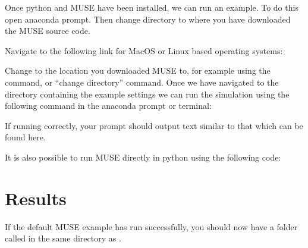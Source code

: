 \documentclass[letterpaper,10pt,english]{sphinxmanual}
\begin{document}
Once python and MUSE have been installed, we can run an example. To do this open anaconda prompt. Then change directory to where you have downloaded the MUSE source code.

Navigate to the following link for MacOS or Linux based operating systems:


Change  to the location you downloaded MUSE to, for example  using the  command, or “change directory” command. Once we have navigated to the directory containing the example settings  we can run the simulation using the following command in the anaconda prompt or terminal:


If running correctly, your prompt should output text similar to that which can be found here.

It is also possible to run MUSE directly in python using the following code:

{
\begin{sphinxVerbatim}[commandchars=\\\{\}]
\llap{\color{nbsphinxin}[ ]:\,\hspace{\fboxrule}\hspace{\fboxsep}}   
  
\end{sphinxVerbatim}
}


\section{Results}
\label{\detokenize{running-muse-example:Results}}
If the default MUSE example has run successfully, you should now have a folder called  in the same directory as .
\end{document}
